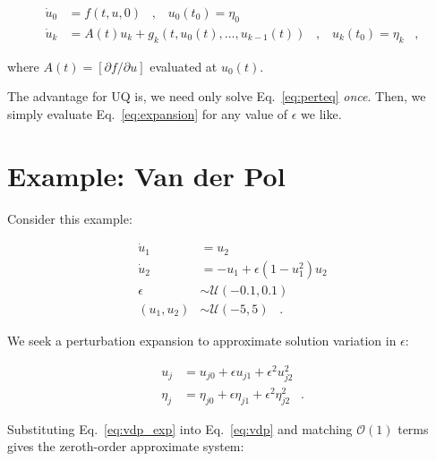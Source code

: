 \documentclass[11pt]{article}
\begin{document}
\begin{equation}
        \label{eq:perteq}
        \begin{aligned}
                \dot{u}_0 &= f( t , u , 0 ) \;\;\; , \;\;\; u_0(t_0) = \eta_0 \\
                \dot{u}_k &= A(t) u_k + g_k( t , u_0(t) , \dots , u_{k-1}(t) ) \;\;\; , \;\;\; u_k(t_0) = \eta_k  \;\;\; ,
        \end{aligned}
\end{equation}

\noindent where $A(t) = [ \partial f / \partial u ]$ evaluated at $u_0(t)$.

\noindent The advantage for UQ is, we need only solve Eq.~\ref{eq:perteq} {\it once}. 
Then, we simply evaluate Eq.~\ref{eq:expansion} for any value of $\epsilon$ we like.

\section{Example: Van der Pol}

Consider this example:

\begin{equation}
        \label{eq:vdp}
        \begin{aligned}
                \dot{u}_1 &= u_2 \\
                \dot{u}_2 &= -u_1 + \epsilon ( 1 - u_1^2 ) u_2 \\
                \epsilon &\sim \mathcal{U}(-0.1,0.1) \\
                (u_1,u_2) &\sim \mathcal{U}(-5,5) \;\;\; .
        \end{aligned}
\end{equation}

\noindent We seek a perturbation expansion to approximate solution variation in $\epsilon$:

\begin{equation}
        \label{eq:vdp_exp}
        \begin{aligned}
                u_j &= u_{j0} + \epsilon u_{j1} + \epsilon^2 u_{j2}^2 \\
                \eta_j &= \eta_{j0} + \epsilon \eta_{j1} + \epsilon^2 \eta_{j2}^2 \;\;\; .
        \end{aligned}
\end{equation}

\noindent Substituting Eq.~\ref{eq:vdp_exp} into Eq.~\ref{eq:vdp} and matching $\mathcal{O}(1)$ terms gives the zeroth-order approximate system:
\end{document}
